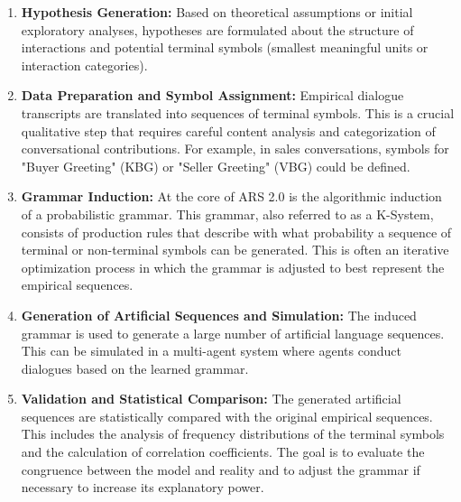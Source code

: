 \documentclass{article}
\begin{document}
\begin{enumerate}
    \item \textbf{Hypothesis Generation:} Based on theoretical assumptions or initial exploratory analyses, hypotheses are formulated about the structure of interactions and potential terminal symbols (smallest meaningful units or interaction categories).
    \item \textbf{Data Preparation and Symbol Assignment:} Empirical dialogue transcripts are translated into sequences of terminal symbols. This is a crucial qualitative step that requires careful content analysis and categorization of conversational contributions. For example, in sales conversations, symbols for "Buyer Greeting" (KBG) or "Seller Greeting" (VBG) could be defined.
    \item \textbf{Grammar Induction:} At the core of ARS 2.0 is the algorithmic induction of a probabilistic grammar. This grammar, also referred to as a K-System, consists of production rules that describe with what probability a sequence of terminal or non-terminal symbols can be generated. This is often an iterative optimization process in which the grammar is adjusted to best represent the empirical sequences.
    \item \textbf{Generation of Artificial Sequences and Simulation:} The induced grammar is used to generate a large number of artificial language sequences. This can be simulated in a multi-agent system where agents conduct dialogues based on the learned grammar.
    \item \textbf{Validation and Statistical Comparison:} The generated artificial sequences are statistically compared with the original empirical sequences. This includes the analysis of frequency distributions of the terminal symbols and the calculation of correlation coefficients. The goal is to evaluate the congruence between the model and reality and to adjust the grammar if necessary to increase its explanatory power.
\end{enumerate}
\end{document}
